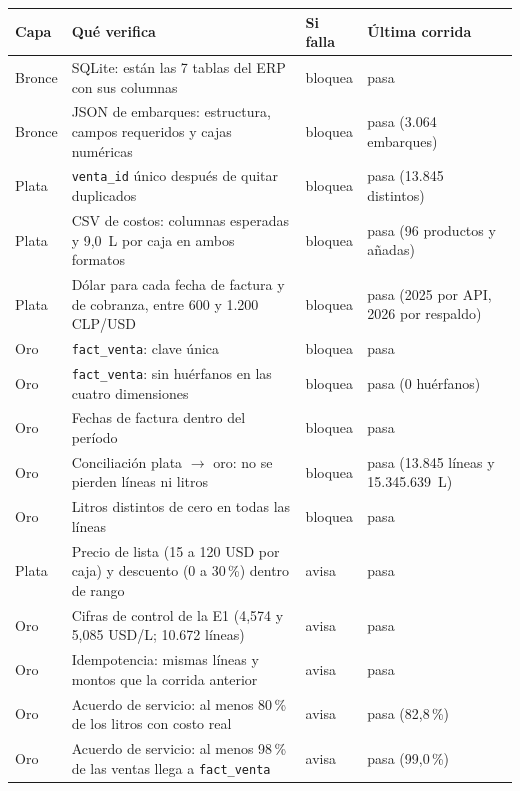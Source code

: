 \begin{center}
\footnotesize
\renewcommand{\arraystretch}{1.1}
\begin{tabular}{@{}l p{8.2cm} l p{3.2cm}@{}}
\toprule
\textbf{Capa} & \textbf{Qué verifica} & \textbf{Si falla} & \textbf{Última corrida} \\
\midrule
Bronce & SQLite: están las 7 tablas del ERP con sus columnas & bloquea & pasa \\
Bronce & JSON de embarques: estructura, campos requeridos y cajas numéricas & bloquea & pasa (3.064 embarques) \\
Plata & \texttt{venta\_id} único después de quitar duplicados & bloquea & pasa (13.845 distintos) \\
Plata & CSV de costos: columnas esperadas y 9,0~L por caja en ambos formatos & bloquea & pasa (96 productos y añadas) \\
Plata & Dólar para cada fecha de factura y de cobranza, entre 600 y 1.200 CLP/USD & bloquea & pasa (2025 por API, 2026 por respaldo) \\
Oro & \texttt{fact\_venta}: clave única & bloquea & pasa \\
Oro & \texttt{fact\_venta}: sin huérfanos en las cuatro dimensiones & bloquea & pasa (0 huérfanos) \\
Oro & Fechas de factura dentro del período & bloquea & pasa \\
Oro & Conciliación plata $\rightarrow$ oro: no se pierden líneas ni litros & bloquea & pasa (13.845 líneas y 15.345.639~L) \\
Oro & Litros distintos de cero en todas las líneas & bloquea & pasa \\
Plata & Precio de lista (15 a 120 USD por caja) y descuento (0 a 30\,\%) dentro de rango & avisa & pasa \\
Oro & Cifras de control de la E1 (4,574 y 5,085 USD/L; 10.672 líneas) & avisa & pasa \\
Oro & Idempotencia: mismas líneas y montos que la corrida anterior & avisa & pasa \\
Oro & Acuerdo de servicio: al menos 80\,\% de los litros con costo real & avisa & pasa (82,8\,\%) \\
Oro & Acuerdo de servicio: al menos 98\,\% de las ventas llega a \texttt{fact\_venta} & avisa & pasa (99,0\,\%) \\
\bottomrule
\end{tabular}
\end{center}
